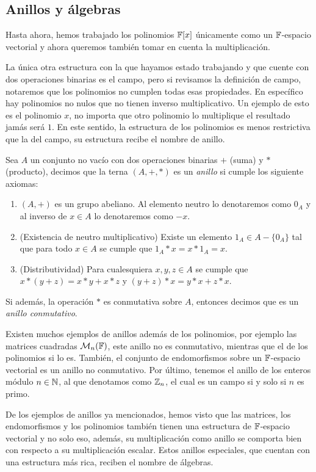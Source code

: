 \subsection{Anillos y álgebras}

Hasta ahora, hemos trabajado los polinomios $\mathbb{F}[x]$ únicamente como un $\mathbb{F}$-espacio vectorial y ahora queremos también tomar en cuenta la multiplicación.

La única otra estructura con la que hayamos estado trabajando y que cuente con dos operaciones binarias es el campo, pero si revisamos la definición de campo, notaremos que los polinomios no cumplen todas esas propiedades. En específico hay polinomios no nulos que no tienen inverso multiplicativo. Un ejemplo de esto es el polinomio $x$, no importa que otro polinomio lo multiplique el resultado jamás será $1$. En este sentido, la estructura de los polinomios es menos restrictiva que la del campo, su estructura recibe el nombre de anillo.

\begin{defi}
  Sea $A$ un conjunto no vacío con dos operaciones binarias $+$ (suma) y $*$ (producto), decimos que la terna $(A,+,*)$ es un \emph{anillo} si cumple los siguiente axiomas:
  \begin{enumerate}
    \item $(A,+)$ es un grupo abeliano. Al elemento neutro lo denotaremos como $0_A$ y al inverso de $x \in A$ lo denotaremos como $-x$.
    \item (Existencia de neutro multiplicativo) Existe un elemento $1_A \in A-\{0_A\}$ tal que para todo $x \in A$ se cumple que $1_A * x = x * 1_A = x$.
    \item (Distributividad) Para cualesquiera $x, y, z \in A$ se cumple que $x * (y + z) = x * y + x * z$ y $(y + z) * x =   y * x + z * x$.
  \end{enumerate}
  Si además, la operación $*$ es conmutativa sobre $A$, entonces decimos que es un \emph{anillo conmutativo}.
\end{defi}

Existen muchos ejemplos de anillos además de los polinomios, por ejemplo las matrices cuadradas $\mathcal{M}_n(\mathbb{F})$, este anillo no es conmutativo, mientras que el de los polinomios si lo es. También, el conjunto de endomorfismos sobre un $\mathbb{F}$-espacio vectorial es un anillo no conmutativo. Por último, tenemos el anillo de los enteros módulo $n \in \mathbb{N}$, al que denotamos como $\mathbb{Z}_n$, el cual es un campo si y solo si $n$ es primo.

De los ejemplos de anillos ya mencionados, hemos visto que las matrices, los endomorfismos y los polinomios también tienen una estructura de $\mathbb{F}$-espacio vectorial y no solo eso, además, su multiplicación como anillo se comporta bien con respecto a su multiplicación escalar. Estos anillos especiales, que cuentan con una estructura más rica, reciben el nombre de álgebras.

